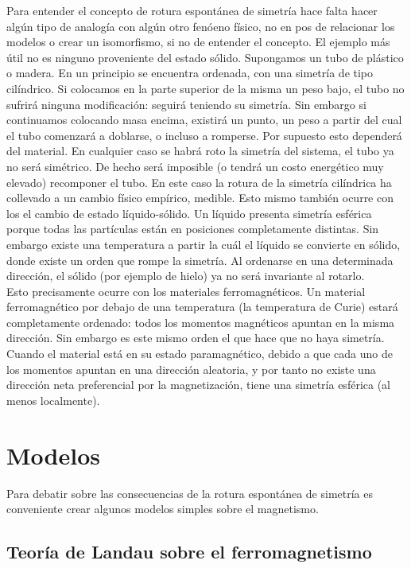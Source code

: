 \documentclass[12pt,a4paper]{book}
\numberwithin{equation}{section}
\numberwithin{figure}{section}
\begin{document}
Para entender el concepto de rotura espontánea de simetría hace falta hacer algún tipo de analogía con algún otro fenóeno físico, no en pos de relacionar los modelos o crear un isomorfismo, si no de entender el concepto. El ejemplo más útil no es ninguno proveniente del estado sólido. Supongamos un tubo de plástico o madera. En un principio se encuentra ordenada, con una simetría de tipo cilíndrico. Si colocamos en la parte superior de la misma un peso bajo, el tubo no sufrirá ninguna modificación: seguirá teniendo su simetría. Sin embargo si continuamos colocando masa encima, existirá un punto, un peso a partir del cual el tubo comenzará a doblarse, o incluso a romperse. Por supuesto esto dependerá del material. En cualquier caso se habrá roto la simetría del sistema, el tubo ya no será simétrico. De hecho será imposible (o tendrá un costo energético muy elevado) recomponer el tubo. En este caso la rotura de la simetría cilíndrica ha collevado a un cambio físico empírico, medible. Esto mismo también ocurre con los el cambio de estado líquido-sólido. Un líquido presenta simetría esférica porque todas las partículas están en posiciones completamente distintas. Sin embargo existe una temperatura a partir la cuál el líquido se convierte en sólido, donde existe un orden que rompe la simetría. Al ordenarse en una determinada dirección, el sólido (por ejemplo de hielo) ya no será invariante al rotarlo. \\

Esto precisamente ocurre con los materiales ferromagnéticos. Un material ferromagnético por debajo de una temperatura (la temperatura de Curie) estará completamente ordenado: todos los momentos magnéticos apuntan en la misma dirección. Sin embargo es este mismo orden el que hace que no haya simetría. Cuando el material está en su estado paramagnético, debido a que cada uno de los momentos apuntan en una dirección aleatoria, y por tanto no existe una dirección neta preferencial por la magnetización, tiene una simetría esférica (al menos localmente). \
 

\section{Modelos} \label{Sec:06-02}

Para debatir sobre las consecuencias de la rotura espontánea de simetría es conveniente crear algunos modelos simples sobre el magnetismo. 

\subsection{Teoría de Landau sobre el ferromagnetismo} \label{Subsec:06-02-01}
\end{document}
